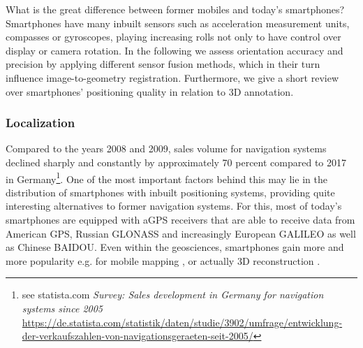\documentclass[review]{elsarticle}
\begin{document}
What is the great difference between former mobiles and today's smartphones? Smartphones have many inbuilt sensors such as acceleration measurement units, compasses or gyroscopes, playing increasing rolls not only to have control over display or camera rotation. In the following we assess orientation accuracy and precision by applying different sensor fusion methods, which in their turn influence image-to-geometry registration. Furthermore, we give a short review over smartphones' positioning quality in relation to 3D annotation.

\subsubsection{Localization}
\label{sec:technology:sensors:localization}

Compared to the years 2008 and 2009, sales volume for navigation systems declined sharply and constantly by approximately 70 percent compared to 2017 in Germany\footnote{see statista.com \textit{Survey: Sales development in Germany for navigation systems since 2005} \url{https://de.statista.com/statistik/daten/studie/3902/umfrage/entwicklung-der-verkaufszahlen-von-navigationsgeraeten-seit-2005/}}. One of the most important factors behind this may lie in the distribution of smartphones with inbuilt positioning systems, providing quite interesting alternatives to former navigation systems.
For this, most of today's smartphones are equipped with \gls{aGPS} receivers that are able to receive data from American GPS, Russian GLONASS and increasingly European GALILEO as well as Chinese BAIDOU. Even within the geosciences, smartphones gain more and more popularity e.g. for mobile mapping \cite{Westhead2011,Masiero2016}, or actually 3D reconstruction \cite{Micheletti2015,Muratov2016,Ishihara2017}. 
\end{document}
